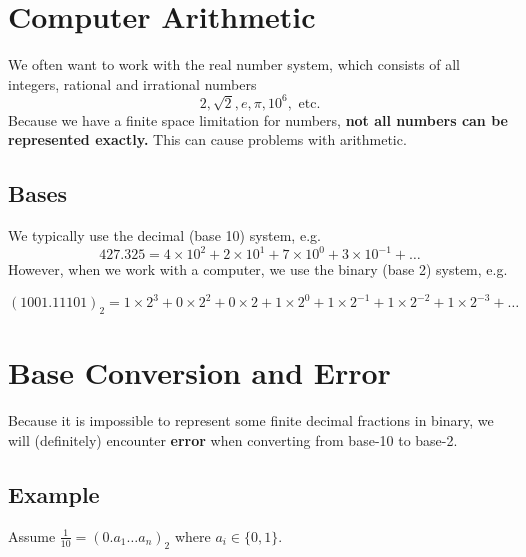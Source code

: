 \section{Computer Arithmetic}

We often want to work with the real number system, which consists of all 
integers, rational and irrational numbers
\begin{equation*}
  2, \sqrt{2}, e, \pi, 10^6, \text{ etc.} 
\end{equation*}
Because we have a finite space limitation for numbers, 
\textbf{not all numbers can be represented exactly.} This can cause problems
with arithmetic.

\subsection{Bases}

We typically use the decimal (base 10) system, e.g.
\begin{equation*}
  427.325 = 4 \times 10^2 + 2 \times 10^1 + 7 \times 10^{0} + 3 \times 10^{-1}+\dots
\end{equation*}
However, when we work with a computer, we use the binary (base 2) system, e.g.

\begin{equation*}
  (1001.11101)_2 = 1\times 2^3 + 0\times 2^2 + 0\times 2 + 1\times 2^0 + 1\times 2^{-1} + 1\times 2^{-2} + 1\times 2^{-3} +\dots
\end{equation*}

\section{Base Conversion and Error}

Because it is impossible to represent some finite decimal fractions in binary,
we will (definitely) encounter \textbf{error} when converting from base-10 to base-2.


\subsection{Example}

Assume $\frac{1}{10} = (0.a_1 \dots a_n)_2$ where $a_i \in \{0, 1\}$.

